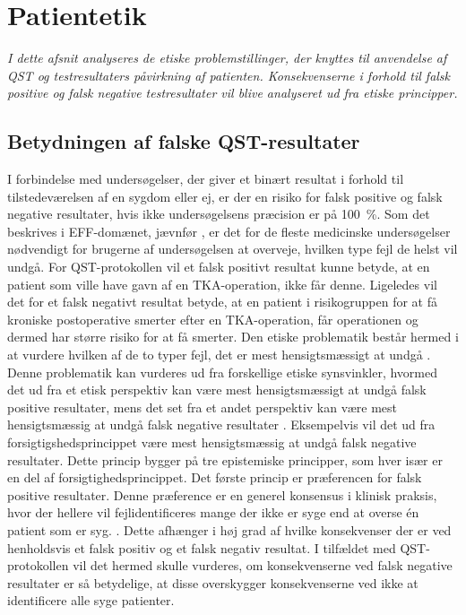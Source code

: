 \section{Patientetik}
\textit{I dette afsnit analyseres de etiske problemstillinger, der knyttes til anvendelse af QST og testresultaters påvirkning af patienten. Konsekvenserne i forhold til falsk positive og falsk negative testresultater vil blive analyseret ud fra etiske principper.}

\subsection{Betydningen af falske QST-resultater}
I forbindelse med undersøgelser, der giver et binært resultat i forhold til tilstedeværelsen af en sygdom eller ej, er der en risiko for falsk positive og falsk negative resultater, hvis ikke undersøgelsens præcision er på 100~\%. Som det beskrives i EFF-domænet, jævnfør , er det for de fleste medicinske undersøgelser nødvendigt for brugerne af undersøgelsen at overveje, hvilken type fejl de helst vil undgå. For QST-protokollen vil et falsk positivt resultat kunne betyde, at en patient som ville have gavn af en TKA-operation, ikke får denne. Ligeledes vil det for et falsk negativt resultat betyde, at en patient i risikogruppen for at få kroniske postoperative smerter efter en TKA-operation, får operationen og dermed har større risiko for at få smerter. Den etiske problematik består hermed i at vurdere hvilken af de to typer fejl, det er mest hensigtsmæssigt at undgå \citep{Kraemer2011}. \\
Denne problematik kan vurderes ud fra forskellige etiske synsvinkler, hvormed det ud fra et etisk perspektiv kan være mest hensigtsmæssigt at undgå falsk positive resultater, mens det set fra et andet perspektiv kan være mest hensigtsmæssig at undgå falsk negative resultater \citep{Kraemer2011}. Eksempelvis vil det ud fra forsigtigshedsprincippet være mest hensigtsmæssig at undgå falsk negative resultater. Dette princip bygger på tre epistemiske principper, som hver især er en del af forsigtighedsprincippet. \citep{Peterson2007} Det første princip er præferencen for falsk positive resultater. Denne præference er en generel konsensus i klinisk praksis, hvor der hellere vil fejlidentificeres mange der ikke er syge end at overse én patient som er syg. \citep{Peterson2007}. Dette afhænger i høj grad af hvilke konsekvenser der er ved henholdsvis et falsk positiv og et falsk negativ resultat. I tilfældet med QST-protokollen vil det hermed skulle vurderes, om konsekvenserne ved falsk negative resultater er så betydelige, at disse overskygger konsekvenserne ved ikke at identificere alle syge patienter. \citep{Peterson2007} \\
